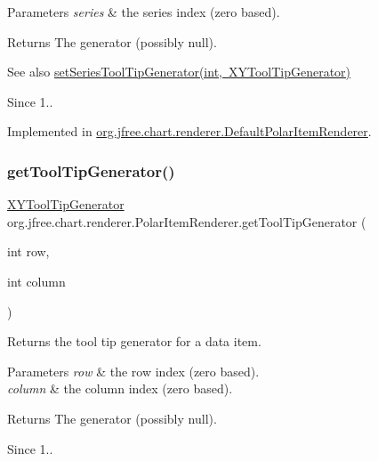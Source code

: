 \begin{DoxyParams}{Parameters}
{\em series} & the series index (zero based).\\
\hline
\end{DoxyParams}
\begin{DoxyReturn}{Returns}
The generator (possibly {\ttfamily null}).
\end{DoxyReturn}
\begin{DoxySeeAlso}{See also}
\mbox{\hyperlink{interfaceorg_1_1jfree_1_1chart_1_1renderer_1_1_polar_item_renderer_a38f9cc455c80c0b6e937bd759a62e3a2}{set\+Series\+Tool\+Tip\+Generator(int, X\+Y\+Tool\+Tip\+Generator)}}
\end{DoxySeeAlso}
\begin{DoxySince}{Since}
1.. 
\end{DoxySince}


Implemented in \mbox{\hyperlink{classorg_1_1jfree_1_1chart_1_1renderer_1_1_default_polar_item_renderer_a359b2063f711745b5728ee139243b678}{org.\+jfree.\+chart.\+renderer.\+Default\+Polar\+Item\+Renderer}}.

\mbox{\label{interfaceorg_1_1jfree_1_1chart_1_1renderer_1_1_polar_item_renderer_a88d1545f3fbb8aaddc89b2afb5ffb050}} 
\subsubsection{\texorpdfstring{get\+Tool\+Tip\+Generator()}{getToolTipGenerator()}}
{\footnotesize\ttfamily \mbox{\hyperlink{interfaceorg_1_1jfree_1_1chart_1_1labels_1_1_x_y_tool_tip_generator}{X\+Y\+Tool\+Tip\+Generator}} org.\+jfree.\+chart.\+renderer.\+Polar\+Item\+Renderer.\+get\+Tool\+Tip\+Generator (\begin{DoxyParamCaption}\item[{int}]{row,  }\item[{int}]{column }\end{DoxyParamCaption})}

Returns the tool tip generator for a data item.


\begin{DoxyParams}{Parameters}
{\em row} & the row index (zero based). \\
\hline
{\em column} & the column index (zero based).\\
\hline
\end{DoxyParams}
\begin{DoxyReturn}{Returns}
The generator (possibly {\ttfamily null}).
\end{DoxyReturn}
\begin{DoxySince}{Since}
1.. 
\end{DoxySince}


